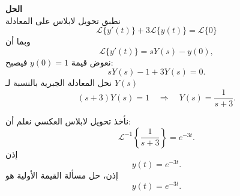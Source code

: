 \noindent
\textbf{الحل}\\
\noindent
    	 نطبق تحويل لابلاس على المعادلة
    	\[
    	\mathcal{L}\{y'(t)\} + 3\mathcal{L}\{y(t)\} = \mathcal{L}\{0\}
    	\]
    	وبما أن
    	\[
    	\mathcal{L}\{y'(t)\} = sY(s) - y(0),
    	\]
    	نعوض قيمة \(y(0)=1\) فيصبح:
    	\[
    	sY(s) - 1 + 3Y(s) = 0.
    	\]
    	نحل المعادلة الجبرية بالنسبة لـ \(Y(s)\)
    	\[
    	(s + 3)Y(s) = 1 \quad \Rightarrow \quad Y(s) = \frac{1}{s+3}.
    	\]
    	
     نأخذ تحويل لابلاس العكسي
    	نعلم أن:
    	\[
    	\mathcal{L}^{-1}\left\{\frac{1}{s+3}\right\} = e^{-3t}.
    	\]
    	إذن
    	\[
    	y(t) = e^{-3t}.
    	\]
    	إذن، حل مسألة القيمة الأولية هو
    	\[
    	y(t) = e^{-3t}.
    	\]
    